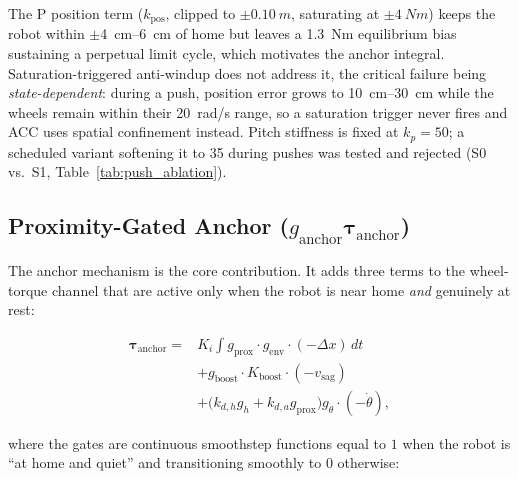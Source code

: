 \documentclass{jcd}
\begin{document}
The P position term ($k_{\text{pos}}$, clipped to $\pm\SI{0.10}{m}$, saturating
at $\pm\SI{4}{Nm}$) keeps the robot within $\pm$\SIrange{4}{6}{cm} of home but
leaves a \SI{1.3}{Nm} equilibrium bias sustaining a perpetual limit cycle, which
motivates the anchor integral. Saturation-triggered anti-windup does not address
it, the critical failure being \emph{state-dependent}: during a push, position
error grows to \SIrange{10}{30}{cm} while the wheels remain within their
\SI{20}{rad/s} range, so a saturation trigger never fires and ACC uses spatial
confinement instead. Pitch stiffness is fixed at $k_p{=}50$; a scheduled variant
softening it to \num{35} during pushes was tested and rejected (S0 vs.\ S1,
Table~\ref{tab:push_ablation}).

\subsection{Proximity-Gated Anchor ($g_{\text{anchor}}\boldsymbol{\tau}_{\text{anchor}}$)}
\label{sec:anchor}

The anchor mechanism is the core contribution. It adds three terms to the
wheel-torque channel that are active only when the robot is near home \emph{and}
genuinely at rest:

\begin{equation}
\begin{split}
\boldsymbol{\tau}_{\text{anchor}} = {}
& K_i\!\int\! g_{\text{prox}}\cdot g_{\text{env}}\cdot(-\Delta x)\,dt\\
& + g_{\text{boost}}\cdot K_{\text{boost}}\cdot(-v_{\text{sag}})\\
& + \bigl(k_{d,h}g_h + k_{d,a}g_{\text{prox}}\bigr)g_{\dot{\theta}}\cdot(-\dot{\theta}),
\end{split}
\label{eq:anchor}
\end{equation}

where the gates are continuous smoothstep functions equal to $1$ when the robot
is ``at home and quiet'' and transitioning smoothly to $0$ otherwise:
\end{document}
